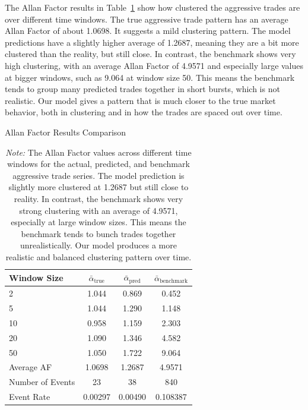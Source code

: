 The Allan Factor results in Table~\ref{tb:allan-factor_com} show how clustered the aggressive trades are over different time windows. The true aggressive trade pattern has an average Allan Factor of about 1.0698. It suggests a mild clustering pattern. The model predictions have a slightly higher average of 1.2687, meaning they are a bit more clustered than the reality, but still close. In contrast, the benchmark shows very high clustering, with an average Allan Factor of 4.9571 and especially large values at bigger windows, such as 9.064 at window size 50. This means the benchmark tends to group many predicted trades together in short bursts, which is not realistic. Our model gives a pattern that is much closer to the true market behavior, both in clustering and in how the trades are spaced out over time.

\begin{table}[tbp]
    \centering
    \caption{Allan Factor Results Comparison}
    \caption*{\textit{Note:} The Allan Factor values across different time windows for the actual, predicted, and benchmark aggressive trade series. The model prediction is slightly more clustered at 1.2687 but still close to reality. In contrast, the benchmark shows very strong clustering with an average of 4.9571, especially at large window sizes. This means the benchmark tends to bunch trades together unrealistically. Our model produces a more realistic and balanced clustering pattern over time.}

    \label{tb:allan-factor_com}
    \begin{tabular}{lccc}
    \toprule
    Window Size & $\bar{\alpha}_\text{true}$ & $\bar{\alpha}_\text{pred}$ & $\bar{\alpha}_\text{benchmark}$ \\
    \midrule
    2   & 1.044 & 0.869 & 0.452 \\
    5   & 1.044 & 1.290 & 1.148 \\
    10  & 0.958 & 1.159 & 2.303 \\
    20  & 1.090 & 1.346 & 4.582 \\
    50  & 1.050 & 1.722 & 9.064 \\
    \midrule
    Average AF & 1.0698 & 1.2687 & 4.9571 \\
    Number of Events & 23 & 38 & 840 \\
    Event Rate & 0.00297 & 0.00490 & 0.108387 \\
    \bottomrule
    \end{tabular}
\end{table}



